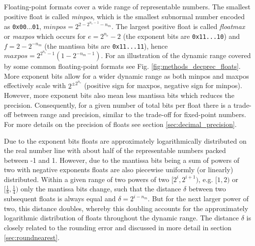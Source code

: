 Floating-point formats cover a wide range of representable numbers. The smallest positive float is called \emph{minpos}, which is the
smallest subnormal number encoded as \texttt{0x00$\dots$01}, $minpos = 2^{2-2^{n_e - 1}-n_m}$. The largest positive float is called
\emph{floatmax} or \emph{maxpos} which occurs for $e=2^{n_e}-2$ (the exponent bits are \texttt{0x11...10}) and 
$f=2-2^{-n_m}$ (the mantissa bits are \texttt{0x11...11}), hence $maxpos = 2^{2^{n_e}-1}\left(1-2^{-n_m-1}\right)$. For an illustration 
of the dynamic range covered by some common floating-point formats see Fig. \ref{fig:methods_decprec_floats}. More exponent
bits allow for a wider dynamic range as both minpos and maxpos effectively scale with $2^{\pm2^{n_e}}$ (positive sign for maxpos,
negative sign for minpos). However, more exponent bits also mean less mantissa bits which reduces the precision. Consequently,
for a given number of total bits per float there is a trade-off between range and precision, similar to the trade-off for fixed-point numbers.
For more details on the precision of floats see section \ref{sec:decimal_precision}.

Due to the exponent bits floats are approximately logarithmically distributed on the real number line with about half of the representable
numbers packed between -1 and 1. However, due to the mantissa bits being a sum of powers of two with negative exponents floats
are also piecewise uniformly (or linearly) distributed. Within a given range of two powers of two $[2^i,2^{i+1})$, e.g. $[1,2)$ or
$[\tfrac{1}{8},\tfrac{1}{4})$ only the mantissa bits change, such that the distance $\delta$ between two subsequent 
floats is always equal and $\delta = 2^{i-n_m}$. But for the next larger power of two, this distance doubles, whereby
this doubling accounts for the approximately logarithmic distribution of floats throughout the dynamic range. The distance $\delta$ is
closely related to the rounding error and discussed in more detail in section \ref{sec:roundnearest}.

